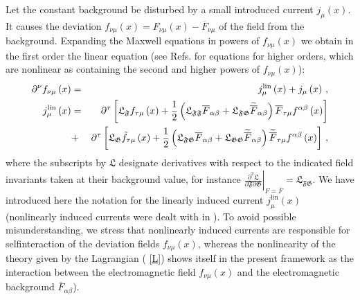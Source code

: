 \documentclass[12pt]{article}
\begin{document}
Let the constant background be disturbed by a small introduced current $%
j_{\mu }\left( x\right) $. It causes the deviation $f_{\nu \mu }\left(
x\right) =F_{\nu \mu }\left( x\right) -\overline{F}_{\nu \mu }$ of the field
from the background. Expanding the Maxwell equations in powers of $f_{\nu
\mu }\left( x\right) $ we obtain in the first order the linear equation (see
Refs. \cite%
{ShaGit2012,CosGitSha2013,AdoGitSha2013,AdoGitShaShi2016,CosGitSha2013a,AdoGitSha2014, AdoGitSha2016,AdoGitSha2015}
for equations for higher orders, which are nonlinear as containing the
second and higher powers of $f_{\nu \mu }\left( x\right) $):%
\begin{eqnarray}
\partial ^{\nu }f_{\nu \mu }\left( x\right) &=&j_{\mu }^{\mathrm{lin}}\left(
x\right) +j_{\mu }\left( x\right) \,,  \notag \\
j_{\mu }^{\mathrm{lin}}\left( x\right) &=&\partial ^{\tau }\left[ \mathfrak{L%
}_{\mathfrak{F}}f_{\tau \mu }\left( x\right) +\frac{1}{2}\left( \mathfrak{L}%
_{\mathfrak{FF}}\overline{F}_{\alpha \beta }+\mathfrak{L}_{\mathfrak{FG}}%
\widetilde{\overline{F}}_{\alpha \beta }\right) \overline{F}_{\tau \mu
}f^{\alpha \beta }\left( x\right) \right]  \notag \\
&+&\partial ^{\tau }\left[ \mathfrak{L}_{\mathfrak{G}}\tilde{f}_{\tau \mu
}\left( x\right) +\frac{1}{2}\left( \mathfrak{L}_{\mathfrak{FG}}\overline{F}%
_{\alpha \beta }+\mathfrak{L}_{\mathfrak{GG}}\widetilde{\overline{F}}%
_{\alpha \beta }\right) \widetilde{\overline{F}}_{\tau \mu }f^{\alpha \beta
}\left( x\right) \right] \,,  \label{s1.51}
\end{eqnarray}%
where the subscripts by $\mathfrak{L}$ designate derivatives with respect to
the indicated field invariants taken at their background value, for instance 
$\left. \frac{\partial ^{2}\mathfrak{L}}{\partial \mathfrak{F}\partial 
\mathfrak{G}}\right\vert _{F=\overline{F}}=\mathfrak{L}_{\mathfrak{FG}}$. We
have introduced here the notation for the linearly induced current $j_{\mu
}^{\mathrm{lin}}\left( x\right) $ (nonlinearly induced currents were dealt
with in \cite{ShaGit2012,CosGitSha2013,AdoGitShaShi2016,CosGitSha2013a,
AdoGitSha2016,AdoGitSha2013,AdoGitSha2014,AdoGitSha2015}). To avoid possible
misunderstanding, we stress that nonlinearly induced currents are
responsible for selfinteraction of the deviation fields $f_{\nu \mu }\left(
x\right) $, whereas the nonlinearity of the theory given by the Lagrangian (%
\ref{L}) shows itself in the present framework as the interaction between
the electromagnetic field $f_{\nu \mu }\left( x\right) $ and the
electromagnetic background $\overline{F}_{\alpha \beta }$).
\end{document}
